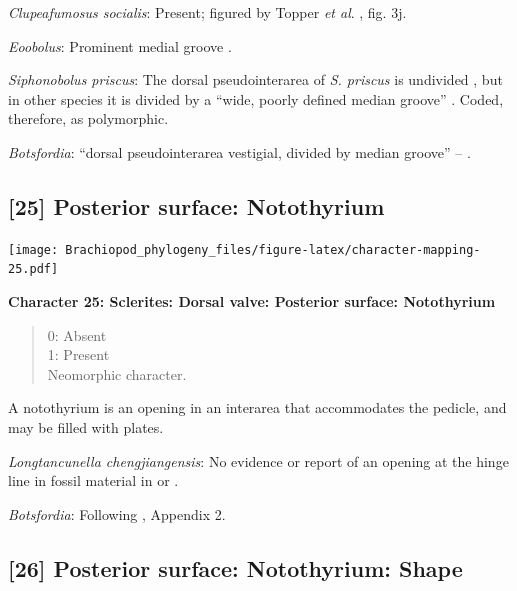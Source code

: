 \documentclass[openany]{book}
\theoremstyle{definition}
\theoremstyle{definition}
\theoremstyle{definition}
\theoremstyle{remark}
\begin{document}
\emph{Clupeafumosus socialis}: Present; figured by Topper \emph{et al}.
\citeyearpar{Topper2013Reappraisalof}, fig. 3j.

\emph{Eoobolus}: Prominent medial groove
\citep{Balthasar2009Thebrachiopod}.

\emph{Siphonobolus priscus}: The dorsal pseudointerarea of \emph{S.
priscus} is undivided \citep{Popov2009Earlyontogeny}, but in other
species it is divided by a ``wide, poorly defined median groove''
\citep{Williams2000BrachiopodaLinguliformea}. Coded, therefore, as
polymorphic.

\emph{Botsfordia}: ``dorsal pseudointerarea vestigial, divided by median
groove'' -- \citet{Williams2000BrachiopodaLinguliformea}.

\hypertarget{posterior-surface-notothyrium}{%
\subsection*{{[}25{]} Posterior surface:
Notothyrium}\label{posterior-surface-notothyrium}}

\texttt{[image: Brachiopod\_phylogeny\_files/figure-latex/character-mapping-25.pdf]}

\textbf{Character 25: Sclerites: Dorsal valve: Posterior surface:
Notothyrium}

\begin{quote}
0: Absent\\
1: Present\\
Neomorphic character.
\end{quote}

A notothyrium is an opening in an interarea that accommodates the
pedicle, and may be filled with plates.

\emph{Longtancunella chengjiangensis}: No evidence or report of an
opening at the hinge line in fossil material in
\citet{Zhang2007Agregarious} or \citet{Zhang2011Theexceptionally}.

\emph{Botsfordia}: Following \citet{Williams1998Thediversity}, Appendix
2.

\hypertarget{posterior-surface-notothyrium-shape}{%
\subsection*{{[}26{]} Posterior surface: Notothyrium:
Shape}\label{posterior-surface-notothyrium-shape}}
\end{document}
